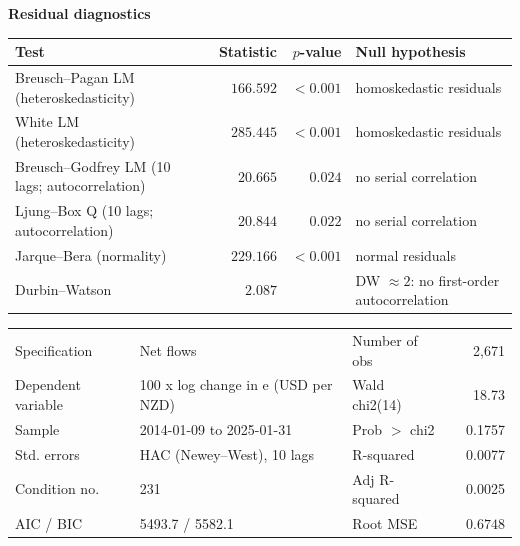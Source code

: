 \documentclass[10pt]{article}
\begin{document}
\noindent\textbf{Residual diagnostics}\\[0.3em]
\begin{tabular}{@{}l|rr l@{}}
\hline
Test & Statistic & $p$-value & Null hypothesis \\
\hline
Breusch--Pagan LM (heteroskedasticity) & $\phantom{-}166.592$ & $<\!0.001$ & homoskedastic residuals \\
White LM (heteroskedasticity) & $\phantom{-}285.445$ & $<\!0.001$ & homoskedastic residuals \\
Breusch--Godfrey LM (10 lags; autocorrelation) & $\phantom{-}20.665$ & $0.024$ & no serial correlation \\
Ljung--Box Q (10 lags; autocorrelation) & $\phantom{-}20.844$ & $0.022$ & no serial correlation \\
Jarque--Bera (normality) & $\phantom{-}229.166$ & $<\!0.001$ & normal residuals \\
Durbin--Watson & $\phantom{-}2.087$ &  & DW $\approx 2$: no first-order autocorrelation \\
\hline
\end{tabular}
\newpage
\noindent\begin{tabular}{@{}l l @{\hspace{3em}} l r@{}}
Specification & Net flows & Number of obs & 2,671 \\
Dependent variable & 100 x log change in e (USD per NZD) & Wald chi2(14) & 18.73 \\
Sample & 2014-01-09 to 2025-01-31 & Prob $>$ chi2 & 0.1757 \\
Std. errors & HAC (Newey--West), 10 lags & R-squared & 0.0077 \\
Condition no. & 231 & Adj R-squared & 0.0025 \\
AIC / BIC & 5493.7 / 5582.1 & Root MSE & $\phantom{-}0.6748$ \\
\end{tabular}
\vspace{0.8em}
\end{document}
